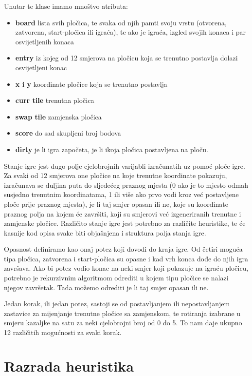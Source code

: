 \documentclass[zavrsnirad]{fer}
\begin{document}
Unutar te klase imamo mnoštvo atributa:
\begin{itemize}
	\item \textbf{board} lista svih pločica, te svaka od njih pamti svoju vrstu (otvorena, zatvorena, start-pločica ili igraća), te ako je igraća, izgled svojih konaca i par osvijetljenih konaca
	\item \textbf{entry} iz kojeg od 12 smjerova na pločicu koja se trenutno postavlja dolazi osvijetljeni konac
	\item \textbf{x i y} koordinate pločice koja se trenutno postavlja
	\item \textbf{curr tile} trenutna pločica
	\item \textbf{swap tile} zamjenska pločica
	\item \textbf{score} do sad skupljeni broj bodova
	\item \textbf{dirty} je li igra započeta, je li ikoja pločica postavljena na ploču.
\end{itemize}

Stanje igre jest dugo polje cjelobrojnih varijabli izračunatih uz pomoć ploče igre. Za svaki od 12 smjerova one pločice na koje trenutne koordinate pokazuju, izračunava se duljina puta do sljedećeg praznog mjesta (0 ako je to mjesto odmah susjedno trenutnim koordinatama, 1 ili više ako prvo vodi kroz već postavljene ploče prije praznog mjesta), je li taj smjer opasan ili ne, koje su koordinate praznog polja na kojem će završiti, koji su smjerovi već izgeneriranih trenutne i zamjenske pločice. Različito stanje igre jest potrebno za različite heuristike, te će kasnije kod opisa svake biti objašnjena i struktura polja stanja igre.

Opasnost definiramo kao onaj potez koji dovodi do kraja igre. Od četiri moguća tipa pločica, zatvorena i start-pločica su opasne i kad vrh konca dođe do njih igra završava. Ako bi potez vodio konac na neki smjer koji pokazuje na igraću pločicu, potrebno je rekurzivnim algoritmom odrediti u kojem tipu pločice se nalazi njegov završetak. Tada možemo odrediti je li taj smjer opasan ili ne.

Jedan korak, ili jedan potez, sastoji se od postavljanjem ili nepostavljanjem zastavice za mijenjanje trenutne pločice sa zamjenskom, te rotiranja izabrane u smjeru kazaljke na satu za neki cjelobrojni broj od 0 do 5. To nam daje ukupno 12 različitih mogućnosti za svaki korak.

\chapter{Razrada heuristika}
\label{pog:razrada_heuristika}
\end{document}
